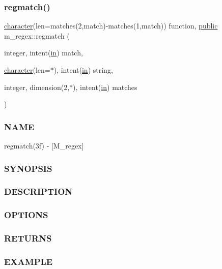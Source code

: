 \subsubsection{\texorpdfstring{regmatch()}{regmatch()}}
{\footnotesize\ttfamily \hyperlink{option__stopwatch_83_8txt_abd4b21fbbd175834027b5224bfe97e66}{character}(len=matches(2,match)-\/matches(1,match)) function, \hyperlink{M__stopwatch_83_8txt_a2f74811300c361e53b430611a7d1769f}{public} m\+\_\+regex\+::regmatch (\begin{DoxyParamCaption}\item[{integer, intent(\hyperlink{M__journal_83_8txt_afce72651d1eed785a2132bee863b2f38}{in})}]{match,  }\item[{\hyperlink{option__stopwatch_83_8txt_abd4b21fbbd175834027b5224bfe97e66}{character}(len=$\ast$), intent(\hyperlink{M__journal_83_8txt_afce72651d1eed785a2132bee863b2f38}{in})}]{string,  }\item[{integer, dimension(2,$\ast$), intent(\hyperlink{M__journal_83_8txt_afce72651d1eed785a2132bee863b2f38}{in})}]{matches }\end{DoxyParamCaption})}



\subsubsection*{N\+A\+ME}

regmatch(3f) -\/ \mbox{[}M\+\_\+regex\mbox{]} \subsubsection*{S\+Y\+N\+O\+P\+S\+IS}

\subsubsection*{D\+E\+S\+C\+R\+I\+P\+T\+I\+ON}

\subsubsection*{O\+P\+T\+I\+O\+NS}

\subsubsection*{R\+E\+T\+U\+R\+NS}

\subsubsection*{E\+X\+A\+M\+P\+LE}